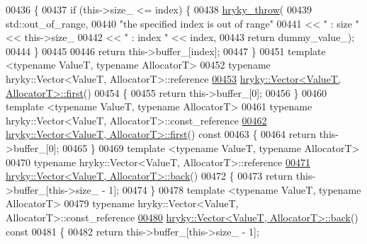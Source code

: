 \begin{DoxyCode}
00436 \textcolor{keyword}{}\{
00437     \textcolor{keywordflow}{if} (this->size\_ <= index) \{
00438         \hyperlink{debug__common_8h_af50606eac4009921527ddcaed392b2c2}{hryky_throw}(
00439             std::out\_of\_range,
00440             \textcolor{stringliteral}{"the specified index is out of range"}
00441             << \textcolor{stringliteral}{" : size "} << this->size\_
00442             << \textcolor{stringliteral}{" : index "} << index,
00443             \textcolor{keywordflow}{return} dummy\_value\_);
00444     \}
00445     
00446     \textcolor{keywordflow}{return} this->buffer\_[index];
00447 \}
00451 \textcolor{keyword}{template} <\textcolor{keyword}{typename} ValueT, \textcolor{keyword}{typename} AllocatorT>
00452 \textcolor{keyword}{typename} hryky::Vector<ValueT, AllocatorT>::reference
\hypertarget{vector_8h_source_l00453}{}\hyperlink{classhryky_1_1_vector_ad7e5eb625467631e061a979bd2060f78}{00453} \hyperlink{classhryky_1_1_vector}{hryky::Vector<ValueT, AllocatorT>::first}()
00454 \{
00455     \textcolor{keywordflow}{return} this->buffer\_[0];
00456 \}
00460 \textcolor{keyword}{template} <\textcolor{keyword}{typename} ValueT, \textcolor{keyword}{typename} AllocatorT>
00461 \textcolor{keyword}{typename} hryky::Vector<ValueT, AllocatorT>::const\_reference
\hypertarget{vector_8h_source_l00462}{}\hyperlink{classhryky_1_1_vector_a86c548a5cc9e116c60a304ff84640ec5}{00462} \hyperlink{classhryky_1_1_vector}{hryky::Vector<ValueT, AllocatorT>::first}()\textcolor{keyword}{ const}
00463 \textcolor{keyword}{}\{
00464     \textcolor{keywordflow}{return} this->buffer\_[0];
00465 \}
00469 \textcolor{keyword}{template} <\textcolor{keyword}{typename} ValueT, \textcolor{keyword}{typename} AllocatorT>
00470 \textcolor{keyword}{typename} hryky::Vector<ValueT, AllocatorT>::reference
\hypertarget{vector_8h_source_l00471}{}\hyperlink{classhryky_1_1_vector_a203f7e037d3d9a132eef014c542f19ee}{00471} \hyperlink{classhryky_1_1_vector}{hryky::Vector<ValueT, AllocatorT>::back}()
00472 \{
00473     \textcolor{keywordflow}{return} this->buffer\_[this->size\_ - 1];
00474 \}
00478 \textcolor{keyword}{template} <\textcolor{keyword}{typename} ValueT, \textcolor{keyword}{typename} AllocatorT>
00479 \textcolor{keyword}{typename} hryky::Vector<ValueT, AllocatorT>::const\_reference
\hypertarget{vector_8h_source_l00480}{}\hyperlink{classhryky_1_1_vector_ac68715f9ad0923f9489aa0272f21b170}{00480} \hyperlink{classhryky_1_1_vector}{hryky::Vector<ValueT, AllocatorT>::back}()\textcolor{keyword}{ const}
00481 \textcolor{keyword}{}\{
00482     \textcolor{keywordflow}{return} this->buffer\_[this->size\_ - 1];

\end{DoxyCode}
